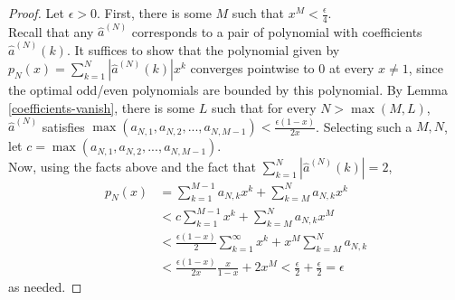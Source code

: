 \documentclass{article}
\theoremstyle{definition}
\theoremstyle{remark}
\numberwithin{equation}{section}
\begin{document}
\begin{proof}
Let $\epsilon > 0$. 
First, there is some $M$ such that $x^M < \frac{\epsilon}{4}$. \\
Recall that any $\hat{a}^{(N)}$ corresponds to a pair of polynomial with coefficients $\hat{a}^{(N)}(k)$. It suffices to show that the polynomial given by $p_N(x) = \sum_{k=1}^N |\hat{a}^{(N)}(k)| x^k$ converges pointwise to 0 at every $x\neq 1$, since the optimal odd/even polynomials are bounded by this polynomial. By Lemma \ref{coefficients-vanish}, there is some $L$ such that for every $N>\max(M,L)$, $\hat{a}^(N)$ satisfies $\max (a_{N,1}, a_{N,2},..., a_{N,M-1}) < \frac{\epsilon(1-x)}{2x}$. Selecting such a $M, N$, let $c = \max (a_{N,1}, a_{N,2},..., a_{N,M-1}) $.\\
Now, using the facts above and the fact that $\sum_{k=1}^N |\hat{a}^{(N)}(k)| = 2$,
\begin{align*}
p_N(x) &= \sum_{k=1}^{M-1} a_{N,k} x^k + \sum_{k=M}^N a_{N,k}x ^k\\
&< c \sum_{k=1}^{M-1} x^ k + \sum_{k=M}^N a_{N,k} x^M \\
&< \frac{\epsilon(1-x)}{2} \sum_{k=1}^\infty x^k + x^M \sum_{k=M}^N a_{N,k}\\
& < \frac{\epsilon(1-x)}{2x} \frac{x}{1-x} + 2x^M < \frac{\epsilon}{2} + \frac{\epsilon}{2} = \epsilon
\end{align*}
as needed.
\end{proof}


  
  
\end{document}
